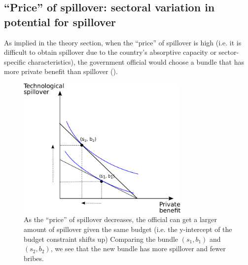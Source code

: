 \subsection{``Price'' of spillover: sectoral variation in potential for spillover}

As implied in the theory section, when the ``price'' of spillover is high (i.e. it is difficult to obtain spillover due to the country's absorptive capacity or sector-specific characteristics), the government official would choose a bundle that has more private benefit than spillover (). 

\begin{figure}[!ht]
	\centering
    \includegraphics[width=0.75\textwidth, height=0.75\textheight,keepaspectratio]{../figure/price_of_spillover}
    \caption{As the ``price'' of spillover decreases, the official can get a larger amount of spillover given the same budget (i.e. the y-intercept of the budget constraint shifts up) Comparing the bundle $(s_1, b_1)$ and $(s_2, b_2)$, we see that the new bundle has more spillover and fewer bribes.}
    \label{fig:price_of_spillover}
\end{figure}

